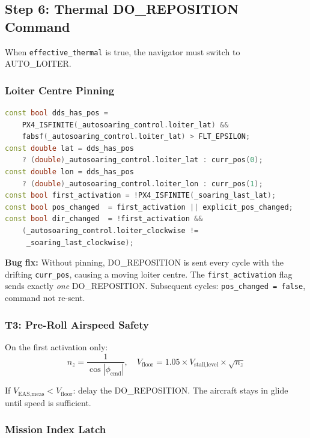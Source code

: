 \documentclass[12pt,a4paper]{article}
\begin{document}
\subsection{Step 6: Thermal DO\_REPOSITION Command}

When \texttt{effective\_thermal} is true, the navigator must switch to
AUTO\_LOITER.

\subsubsection{Loiter Centre Pinning}

\begin{lstlisting}[language=C++]
const bool dds_has_pos =
    PX4_ISFINITE(_autosoaring_control.loiter_lat) &&
    fabsf(_autosoaring_control.loiter_lat) > FLT_EPSILON;
const double lat = dds_has_pos
    ? (double)_autosoaring_control.loiter_lat : curr_pos(0);
const double lon = dds_has_pos
    ? (double)_autosoaring_control.loiter_lon : curr_pos(1);
const bool first_activation = !PX4_ISFINITE(_soaring_last_lat);
const bool pos_changed  = first_activation || explicit_pos_changed;
const bool dir_changed  = !first_activation &&
    (_autosoaring_control.loiter_clockwise !=
     _soaring_last_clockwise);
\end{lstlisting}

\textbf{Bug fix:} Without pinning, DO\_REPOSITION is sent every cycle with
the drifting \texttt{curr\_pos}, causing a moving loiter centre.
The \texttt{first\_activation} flag sends exactly \emph{one}
DO\_REPOSITION. Subsequent cycles: \texttt{pos\_changed = false},
command not re-sent.

\subsubsection{T3: Pre-Roll Airspeed Safety}

On the first activation only:
\begin{equation}
  n_z = \frac{1}{\cos|\phi_{\text{cmd}}|}, \quad
  V_{\text{floor}} = 1.05 \times V_{\text{stall,level}} \times \sqrt{n_z}
\end{equation}

If $V_{\text{EAS,meas}} < V_{\text{floor}}$: delay the DO\_REPOSITION.
The aircraft stays in glide until speed is sufficient.

\subsubsection{Mission Index Latch}
\end{document}
